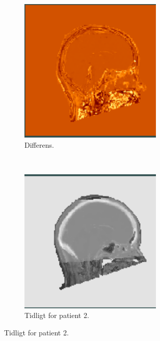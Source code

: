 \begin{figure}
    \begin{subfigure}{0.3\textwidth}
        \centering
        \includegraphics[width=0.75\textwidth]{colager/over_tid_sct/over_tid_sct_121280_sub.png}
        \caption{Differens.}
        \label{col:over_time_sct_pat1_sub}
    \end{subfigure}\\
    \begin{subfigure}{0.3\textwidth}
        \centering
        \includegraphics[width=0.75\textwidth]{colager/over_tid_sct/over_tid_sct_140547_early.png}
        \caption{Tidligt for patient 2.}
        \label{col:over_time_sct_pat2_early}
    \end{subfigure}\hfill

\end{figure}
